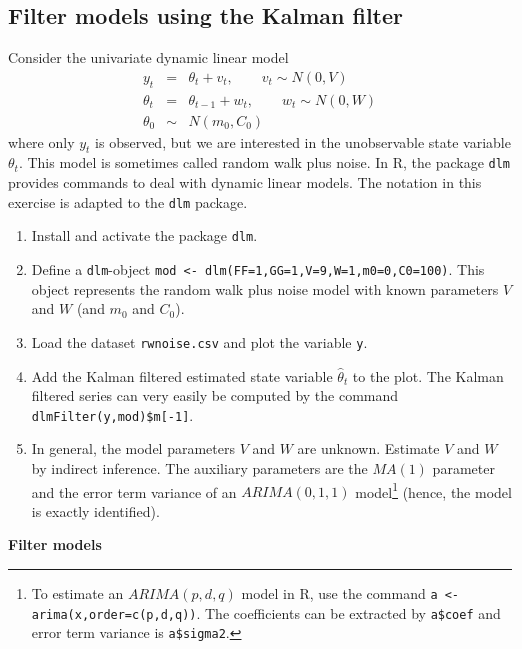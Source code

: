 \documentclass{article}
\begin{document}
\subsection{Filter models using the Kalman filter}
Consider the univariate dynamic linear model%
\begin{eqnarray*}
y_{t} &=&\theta _{t}+v_{t},\qquad v_{t}\sim N\left( 0,V\right) \\
\theta _{t} &=&\theta _{t-1}+w_{t},\qquad w_{t}\sim N(0,W) \\
\theta _{0} &\sim &N\left( m_{0},C_{0}\right)
\end{eqnarray*}%
where only $y_{t}$ is observed, but we are interested in the unobservable
state variable $\theta _{t}$. This model is sometimes called random walk
plus noise. In R, the package \texttt{dlm} provides commands to deal with
dynamic linear models. The notation in this exercise is adapted to the
\texttt{dlm} package.

\begin{enumerate}
\item Install and activate the package \texttt{dlm}.

\item Define a \texttt{dlm}-object \texttt{mod <-
dlm(FF=1,GG=1,V=9,W=1,m0=0,C0=100)}. This object represents the random walk
plus noise model with known parameters $V$ and $W$ (and $m_{0}$ and $C_{0}$).

\item Load the dataset \texttt{rwnoise.csv} and plot the variable \texttt{y}.

\item Add the Kalman filtered estimated state variable $\hat{\theta}_{t}$ to
the plot. The Kalman filtered series can very easily be computed by the
command \texttt{dlmFilter(y,mod)\$m[-1]}.

\item In general, the model parameters $V$ and $W$ are unknown. Estimate $V$
and $W$ by indirect inference. The auxiliary parameters are the $MA(1)$
parameter and the error term variance of an $ARIMA(0,1,1)$ model\footnote{%
To estimate an $ARIMA(p,d,q)$ model in R, use the command \texttt{a
<- arima(x,order=c(p,d,q))}. The coefficients can be extracted
by \texttt{a\$coef} and error term variance is \texttt{a\$sigma2}.} (hence,
the model is exactly identified).
\end{enumerate}

\begin{solution}
\textbf{Filter models }
\end{solution}
\end{document}
